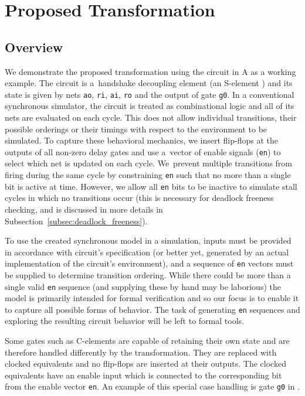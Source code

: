 \vspace{0.2cm}

\section{Proposed Transformation}
\label{sec:proposed}

\subsection{Overview}

We demonstrate the proposed transformation using the circuit in
A as a working example. The circuit is a~handshake
decoupling element (an S-element \cite{bardsley2000implementing}) and its
state is given by nets \texttt{ao}, \texttt{ri}, \texttt{ai}, \texttt{ro} and
the output of gate \texttt{g0}. In a conventional synchronous simulator, the
circuit is treated as combinational logic and all of its nets are evaluated on
each cycle. This does not allow individual transitions, their possible
orderings or their timings with respect to the environment to be simulated. To
capture these behavioral mechanics, we insert flip-flops at the outputs of all
non-zero delay gates and use a~vector of enable signals (\texttt{en}) to
select which net is updated on each cycle. We~prevent multiple transitions
from firing during the same cycle by constraining \texttt{en} such that no
more than a single bit is active at time. However, we allow all \texttt{en}
bits to be inactive to simulate stall cycles in which no transitions occur
(this is necessary for deadlock freeness checking, and is discussed in more
details in Subsection~\ref{subsec:deadlock_freeness}).

To use the created synchronous model in a simulation, inputs must be provided
in accordance with circuit's specification (or better yet, generated by an
actual implementation of the circuit's environment), and a sequence of
\texttt{en} vectors must be supplied to determine transition ordering. While
there could be more than a single valid \texttt{en} sequence (and supplying
these by hand may be laborious) the model is primarily intended for formal
verification and so our focus is to enable it to capture all possible forms of
behavior. The task of generating \texttt{en} sequences and exploring the
resulting circuit behavior will be left to formal tools.



Some gates such as C-elements are capable of retaining their own state and are
therefore handled differently by the transformation. They are replaced with
clocked equivalents and no flip-flops are inserted at their outputs. The
clocked equivalents have an enable input which is connected to the
corresponding bit from the enable vector \texttt{en}. An example of this
special case handling is gate \texttt{g0} in .

